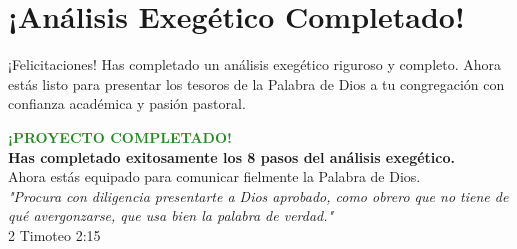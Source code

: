 \documentclass[11pt,a4paper]{article}
\begin{document}
\section{¡Análisis Exegético Completado!}

¡Felicitaciones! Has completado un análisis exegético riguroso y completo. Ahora estás listo para presentar los tesoros de la Palabra de Dios a tu congregación con confianza académica y pasión pastoral.

\vspace{1cm}

\begin{center}
\begin{tcolorbox}[colback=forestgreen!20, colframe=forestgreen, width=0.8\textwidth]
\centering
\textcolor{forestgreen}{\textbf{\Large ¡PROYECTO COMPLETADO!}}\\[0.5cm]
\textcolor{papergray}{\textbf{Has completado exitosamente los 8 pasos del análisis exegético.}}\\
\textcolor{papergray}{Ahora estás equipado para comunicar fielmente la Palabra de Dios.}\\[0.5cm]
\textcolor{sagegreen}{\textit{"Procura con diligencia presentarte a Dios aprobado, como obrero que no tiene de qué avergonzarse, que usa bien la palabra de verdad."}}\\
\textcolor{papergray}{\small 2 Timoteo 2:15}
\end{tcolorbox}
\end{center}
\end{document}
